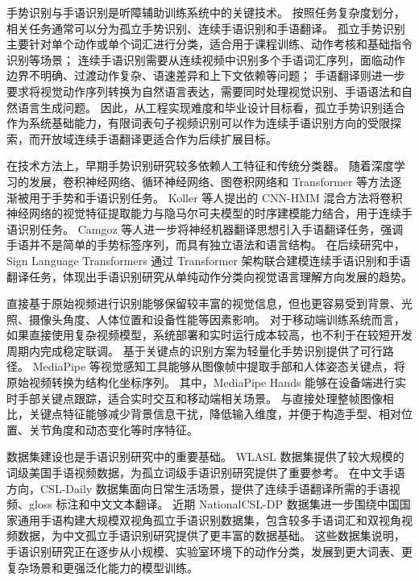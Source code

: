 手势识别与手语识别是听障辅助训练系统中的关键技术。
按照任务复杂度划分，相关任务通常可以分为孤立手势识别、连续手语识别和手语翻译。
孤立手势识别主要针对单个动作或单个词汇进行分类，适合用于课程训练、动作考核和基础指令识别等场景；
连续手语识别需要从连续视频中识别多个手语词汇序列，面临动作边界不明确、过渡动作复杂、语速差异和上下文依赖等问题；
手语翻译则进一步要求将视觉动作序列转换为自然语言表达，需要同时处理视觉识别、手语语法和自然语言生成问题\cite{bragg-sign-language-ai-2019}。
因此，从工程实现难度和毕业设计目标看，孤立手势识别适合作为系统基础能力，有限词表句子视频识别可以作为连续手语识别方向的受限探索，而开放域连续手语翻译更适合作为后续扩展目标。

在技术方法上，早期手势识别研究较多依赖人工特征和传统分类器。
随着深度学习的发展，卷积神经网络、循环神经网络、图卷积网络和 Transformer 等方法逐渐被用于手势和手语识别任务。
Koller 等人提出的 CNN-HMM 混合方法将卷积神经网络的视觉特征提取能力与隐马尔可夫模型的时序建模能力结合，用于连续手语识别任务\cite{koller-deep-sign-2018}。
Camgoz 等人进一步将神经机器翻译思想引入手语翻译任务，强调手语并不是简单的手势标签序列，而具有独立语法和语言结构\cite{camgoz-neural-slt-2018}。
在后续研究中，Sign Language Transformers 通过 Transformer 架构联合建模连续手语识别和手语翻译任务，体现出手语识别研究从单纯动作分类向视觉语言理解方向发展的趋势\cite{camgoz-slt-transformers-2020}。

直接基于原始视频进行识别能够保留较丰富的视觉信息，但也更容易受到背景、光照、摄像头角度、人体位置和设备性能等因素影响。
对于移动端训练系统而言，如果直接使用复杂视频模型，系统部署和实时运行成本较高，也不利于在较短开发周期内完成稳定联调。
基于关键点的识别方案为轻量化手势识别提供了可行路径。
MediaPipe 等视觉感知工具能够从图像帧中提取手部和人体姿态关键点，将原始视频转换为结构化坐标序列\cite{lugaresi-mediapipe-2019}。
其中，MediaPipe Hands 能够在设备端进行实时手部关键点跟踪，适合实时交互和移动端相关场景\cite{zhang-mediapipe-hands-2020}。
与直接处理整帧图像相比，关键点特征能够减少背景信息干扰，降低输入维度，并便于构造手型、相对位置、关节角度和动态变化等时序特征。

数据集建设也是手语识别研究中的重要基础。
WLASL 数据集提供了较大规模的词级美国手语视频数据，为孤立词级手语识别研究提供了重要参考\cite{li-wlasl-2020}。
在中文手语方向，CSL-Daily 数据集面向日常生活场景，提供了连续手语翻译所需的手语视频、gloss 标注和中文文本翻译\cite{zhou-csl-daily-2021}。
近期 NationalCSL-DP 数据集进一步围绕中国国家通用手语构建大规模双视角孤立手语识别数据集，包含较多手语词汇和双视角视频数据，为中文孤立手语识别研究提供了更丰富的数据基础\cite{jin-national-csl-dp-2025}。
这些数据集说明，手语识别研究正在逐步从小规模、实验室环境下的动作分类，发展到更大词表、更复杂场景和更强泛化能力的模型训练。

